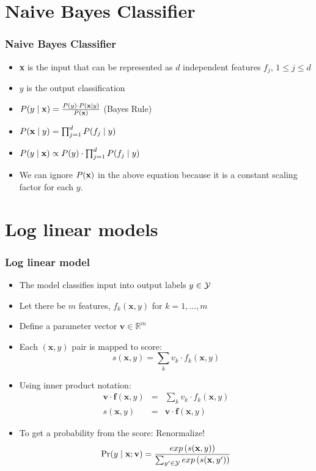 
\section{Naive Bayes Classifier}
\frame{\tableofcontents[currentsection]}

\begin{frame}
\frametitle{Naive Bayes Classifier}
\begin{itemize}[<+->]
\item \textbf{x} is the input that can be represented as $d$ independent features $f_j$, $1 \leq j \leq d$
\item $y$ is the output classification
\item $P(y \mid {\bf x}) = \frac{P(y) \cdot P({\bf x} \mid y)}{P({\bf x})}$ (Bayes Rule)
\item $P({\bf x} \mid y) = \prod_{j=1}^{d} P(f_j  \mid y)$
\item $P(y \mid {\bf x}) \propto P(y) \cdot  \prod_{j=1}^{d} P(f_j  \mid y) $
\item We can ignore $P({\bf x})$ in the above equation because it is a constant scaling factor for each $y$.
\end{itemize}
\end{frame}

\section{Log linear models}
\frame{\tableofcontents[currentsection]}

\begin{frame}
\frametitle{Log linear model}
\begin{itemize}[<+->]
\item The model classifies input into output labels $y \in {\cal Y}$
\item Let there be $m$ features, $f_k(\textbf{x}, y)$ for $k = 1, \ldots, m$
\item Define a parameter vector $\textbf{v} \in \mathbb{R}^m$
\item Each $(\textbf{x}, y)$ pair is mapped to score:
\[ s(\textbf{x}, y) = \sum_k v_k \cdot f_k(\textbf{x}, y) \]
\item Using inner product notation:
\begin{eqnarray*}
\textbf{v} \cdot \textbf{f}(\textbf{x}, y) & = & \sum_k v_k \cdot f_k(\textbf{x}, y) \\
s(\textbf{x}, y) & = & \textbf{v} \cdot \textbf{f}(\textbf{x}, y) 
\end{eqnarray*}
\item To get a probability from the score: Renormalize! 
\[ \Pr(y \mid \textbf{x}; \textbf{v}) = \frac{exp\left(s(\textbf{x}, y)\right)}{\sum_{y' \in {\cal Y}} exp\left(s(\textbf{x}, y')\right)} \]
\end{itemize}
\end{frame}


